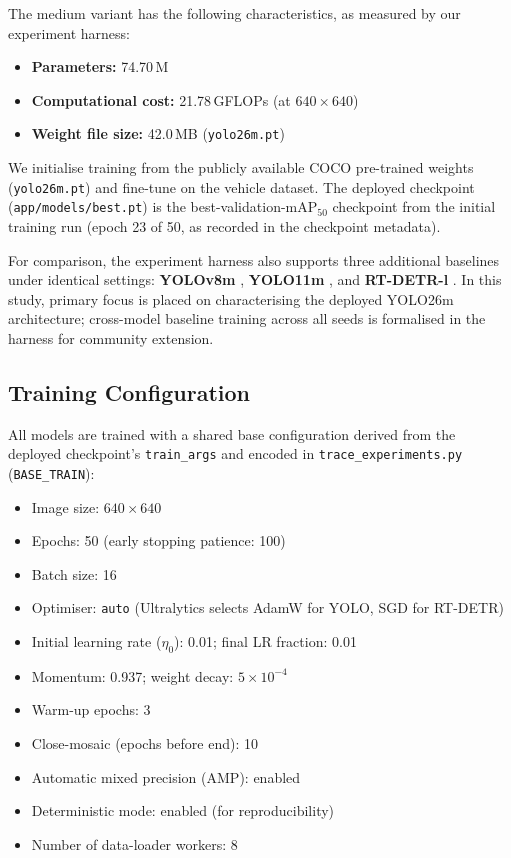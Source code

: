 The medium variant has the following characteristics, as measured by our
experiment harness:

\begin{itemize}
  \item \textbf{Parameters:} 74.70\,M
  \item \textbf{Computational cost:} 21.78\,GFLOPs (at $640\times640$)
  \item \textbf{Weight file size:} 42.0\,MB (\texttt{yolo26m.pt})
\end{itemize}

We initialise training from the publicly available COCO pre-trained
weights (\texttt{yolo26m.pt}) and fine-tune on the vehicle dataset.
The deployed checkpoint (\texttt{app/models/best.pt}) is the
best-validation-mAP$_{50}$ checkpoint from the initial training run
(epoch 23 of 50, as recorded in the checkpoint metadata).

For comparison, the experiment harness also supports three additional
baselines under identical settings:
\textbf{YOLOv8m} \cite{jocher2023ultralytics}, \textbf{YOLO11m} \cite{ultralytics_yolo11},
and \textbf{RT-DETR-l} \cite{rtdetr2022}.
In this study, primary focus is placed on characterising the deployed YOLO26m architecture;
cross-model baseline training across all seeds is formalised in the harness for community extension.

\subsection{Training Configuration}
\label{sec:training}

All models are trained with a shared base configuration derived from the
deployed checkpoint's \texttt{train\_args} and encoded in
\texttt{trace\_experiments.py} (\texttt{BASE\_TRAIN}):

\begin{itemize}
  \item Image size: $640\times640$
  \item Epochs: 50 (early stopping patience: 100)
  \item Batch size: 16
  \item Optimiser: \texttt{auto} (Ultralytics selects AdamW for YOLO,
        SGD for RT-DETR)
  \item Initial learning rate ($\eta_0$): 0.01; final LR fraction: 0.01
  \item Momentum: 0.937; weight decay: $5\times10^{-4}$
  \item Warm-up epochs: 3
  \item Close-mosaic (epochs before end): 10
  \item Automatic mixed precision (AMP): enabled
  \item Deterministic mode: enabled (for reproducibility)
  \item Number of data-loader workers: 8
\end{itemize}

